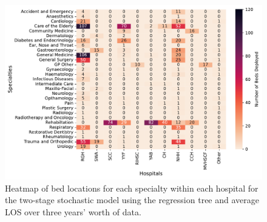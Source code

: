 \documentclass[thesis.tex]{subfiles}
\begin{document}
\begin{figure}
    \centering
    \includegraphics[scale=0.55]{Figures - Heatmaps/Fig2.pdf}
    \caption{Heatmap of bed locations for each specialty within each hospital for the two-stage stochastic model using the regression tree and average LOS over three years' worth of data.}
    \label{fig:app2}
\end{figure}
\end{document}
